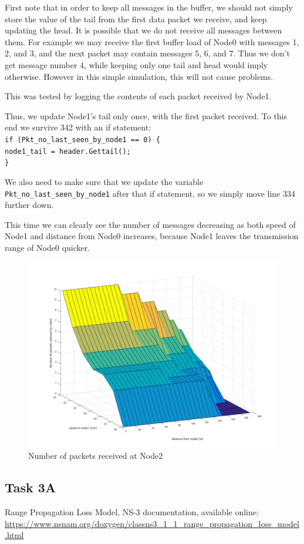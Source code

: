 \documentclass[11pt,journal]{article}
\newcommand\tab[1][1cm]{\hspace*{#1}}
\begin{document}
	First note that in order to keep all messages in the buffer, we should not simply store the value  of the tail from the first data packet we receive, and keep updating the head. It is possible that we do not receive all messages between them. For example we may receive the first buffer load of Node0 with messages 1, 2, and 3, and the next packet may contain messages 5, 6, and 7. Thus we don't get message number 4, while keeping only one tail and head would imply otherwise. However in this simple simulation, this will not cause problems.
	
	This was tested by logging the contents of each packet received by Node1.
	
	Thus, we update Node1's tail only once, with the first packet received. To this end we survive 342 with an if statement:\\
	\tab\texttt{if (Pkt\_no\_last\_seen\_by\_node1 == 0) \{ }\\
	\tab\tab \texttt{node1\_tail = header.Gettail();}\\
	\tab\texttt{\}}
	
	We also need to make sure that we update the variable \texttt{Pkt\_no\_last\_seen\_by\_node1} after that if statement, so we simply move line 334 further down.
	
	This time we can clearly see the number of messages decreasing as both speed of Node1 and distance from Node0 increases, because Node1 leaves the transmission range of Node0 quicker.	
	
	\begin{figure}[h]
		\centering
		\includegraphics[scale=0.4]{graph2b.png}
		\caption{Number of packets received at Node2}
	\end{figure}
	
	\pagebreak
	\subsection{Task 3A}
	
	\pagebreak
	\begin{thebibliography}{1}
		Range Propagation Loss Model, NS-3 documentation, available online: \url{https://www.nsnam.org/doxygen/classns3_1_1_range_propagation_loss_model.html}
	\end{thebibliography}
\end{document}
